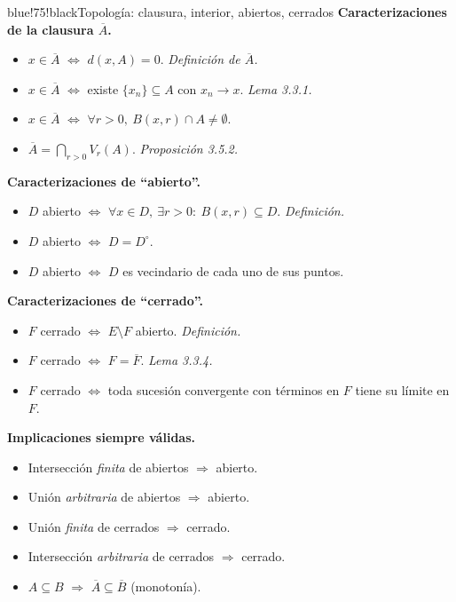 \documentclass[11pt,twoside]{article}
\begin{document}
\begin{equivbox}{blue!75!black}{Topología: clausura, interior, abiertos, cerrados}
\textbf{Caracterizaciones de la clausura $\overline{A}$.}
\begin{itemize}[leftmargin=2em,itemsep=2pt]
\item $x \in \overline{A}$ $\Leftrightarrow$ $d(x, A) = 0$. \hfill\textit{Definición de $\overline{A}$.}
\item $x \in \overline{A}$ $\Leftrightarrow$ existe $\{x_{n}\} \subseteq A$ con $x_{n} \to x$. \hfill\textit{Lema 3.3.1.}
\item $x \in \overline{A}$ $\Leftrightarrow$ $\forall r > 0,\ B(x, r) \cap A \neq \emptyset$.
\item $\overline{A} = \bigcap_{r > 0} V_{r}(A)$. \hfill\textit{Proposición 3.5.2.}
\end{itemize}

\textbf{Caracterizaciones de ``abierto''.}
\begin{itemize}[leftmargin=2em,itemsep=2pt]
\item $D$ abierto $\Leftrightarrow$ $\forall x \in D,\ \exists r > 0:\ B(x, r) \subseteq D$. \hfill\textit{Definición.}
\item $D$ abierto $\Leftrightarrow$ $D = D^{\circ}$.
\item $D$ abierto $\Leftrightarrow$ $D$ es vecindario de cada uno de sus puntos.
\end{itemize}

\textbf{Caracterizaciones de ``cerrado''.}
\begin{itemize}[leftmargin=2em,itemsep=2pt]
\item $F$ cerrado $\Leftrightarrow$ $E \setminus F$ abierto. \hfill\textit{Definición.}
\item $F$ cerrado $\Leftrightarrow$ $F = \overline{F}$. \hfill\textit{Lema 3.3.4.}
\item $F$ cerrado $\Leftrightarrow$ toda sucesión convergente con términos en $F$ tiene su límite en $F$.
\end{itemize}

\textbf{Implicaciones siempre válidas.}
\begin{itemize}[leftmargin=2em,itemsep=2pt]
\item Intersección \emph{finita} de abiertos $\Rightarrow$ abierto.
\item Unión \emph{arbitraria} de abiertos $\Rightarrow$ abierto.
\item Unión \emph{finita} de cerrados $\Rightarrow$ cerrado.
\item Intersección \emph{arbitraria} de cerrados $\Rightarrow$ cerrado.
\item $A \subseteq B$ $\Rightarrow$ $\overline{A} \subseteq \overline{B}$ (monotonía).
\end{itemize}


\end{equivbox}
\end{document}
